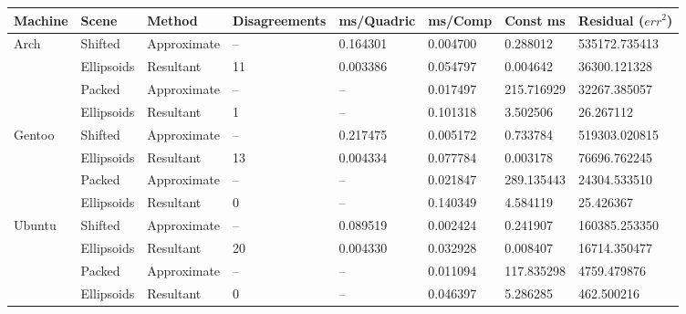 \begin{tabular}{|l|l|ll|lll|l|}
\hline
Machine & Scene & Method & Disagreements & ms/Quadric & ms/Comp & Const ms & Residual ($err^2$)\\
\hline
\hline
Arch & Shifted & Approximate & -- & 0.164301 & 0.004700 & 0.288012 & 535172.735413\\
& Ellipsoids & Resultant & 11 & 0.003386 & 0.054797 & 0.004642 & 36300.121328\\
\hline
& Packed & Approximate & -- & -- & 0.017497 & 215.716929 & 32267.385057\\
& Ellipsoids & Resultant & 1 & -- & 0.101318 & 3.502506 & 26.267112\\
\hline
Gentoo & Shifted & Approximate & -- & 0.217475 & 0.005172 & 0.733784 & 519303.020815\\
& Ellipsoids & Resultant & 13 & 0.004334 & 0.077784 & 0.003178 & 76696.762245\\
\hline
& Packed & Approximate & -- & -- & 0.021847 & 289.135443 & 24304.533510\\
& Ellipsoids & Resultant & 0 & -- & 0.140349 & 4.584119 & 25.426367\\
\hline
Ubuntu & Shifted & Approximate & -- & 0.089519 & 0.002424 & 0.241907 & 160385.253350\\
& Ellipsoids & Resultant & 20 & 0.004330 & 0.032928 & 0.008407 & 16714.350477\\
\hline
& Packed & Approximate & -- & -- & 0.011094 & 117.835298 & 4759.479876\\
& Ellipsoids & Resultant & 0 & -- & 0.046397 & 5.286285 & 462.500216\\
\hline
\end{tabular}
